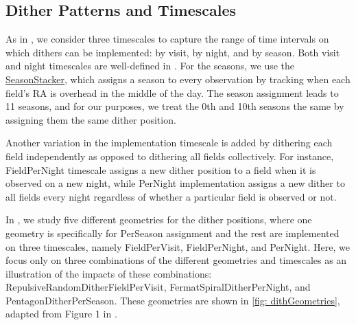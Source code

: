 \subsection{Dither Patterns and Timescales}
\label{sec:\secname:strategies}
As in \citet{AwanEtal2016}, we consider three timescales to capture the range of time intervals on which dithers can be implemented: by visit, by night, and by season. Both visit and night timescales are well-defined in \OpSim \citep[see]{IvezicEtal2008}. For the seasons, we use the \href{https://github.com/lsst/sims_maf/blob/master/python/lsst/sims/maf/stackers/generalStackers.py}{SeasonStacker}, which assigns a season to every observation by tracking when each field's RA is overhead in the middle of the day. The season assignment leads to 11 seasons, and for our purposes, we treat the 0th and 10th seasons the same by assigning them the same dither position.

Another variation in the implementation timescale is added by dithering each field independently as opposed to dithering all fields collectively. For instance, FieldPerNight timescale assigns a new dither position to a field when it is observed on a new night, while PerNight implementation assigns a new dither to all fields every night regardless of whether a particular field is observed or not.

In \citet{AwanEtal2016}, we study five different geometries for the dither positions, where one geometry is specifically for PerSeason assignment and the rest are implemented on three timescales, namely FieldPerVisit, FieldPerNight, and PerNight. Here, we focus only on three combinations of the different geometries and timescales as an illustration of the impacts of these combinations: RepulsiveRandomDitherFieldPerVisit, FermatSpiralDitherPerNight,  and PentagonDitherPerSeason. These geometries are shown in \autoref{fig: dithGeometries}, adapted from Figure 1 in \citet{AwanEtal2016}.

